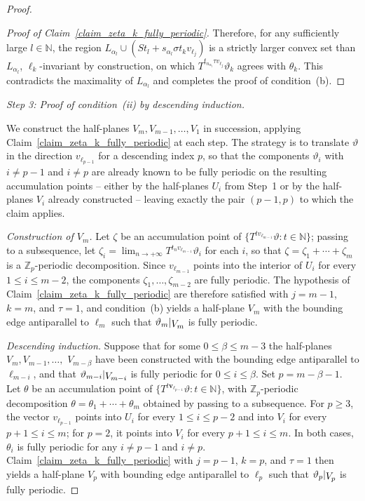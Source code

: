 \documentclass[12pt]{amsart}
\numberwithin{equation}{section}
\newcommand{\bb}[1]{\mathbb{#1}}
\newcommand{\sob}[1]{\ensuremath{{\mathbin |}\raise-.4ex\hbox{$#1$}}}
\begin{document}
\begin{proof}
\begin{proof}[Proof of Claim~\ref{claim_zeta_k_fully_periodic}]
Therefore, for any sufficiently large $l \in \mathbb{N}$, the region
$L_{\alpha_l} \cup (St_l + s_{\alpha_l}\sigma t_k v_{\pmb{\ell}_{j}})$ is a
strictly larger convex set than $L_{\alpha_l}$, $\ell_k$-invariant by
construction, on which $T^{t_{n_{\alpha_l}}\tau v_{\pmb{\ell}_{j}}}\vartheta_k$
agrees with $\theta_k$. This contradicts the maximality of $L_{\alpha_l}$
and completes the proof of condition~(b).
\end{proof}

\medskip

\noindent\textit{Step 3: Proof of condition~\textup{(ii)} by descending induction.}

\smallskip

We construct the half-planes $ V_m, V_{m-1}, \ldots, V_1 $ in succession, applying Claim~\ref{claim_zeta_k_fully_periodic} at each step. The strategy is to translate $ \vartheta $
in the direction $ v_{\pmb{\ell}_{p-1}} $ for a descending index $ p $, so that the components 
$ \vartheta_i $ with $ i \neq p-1 $ and $ i \neq p $ are already known to be fully periodic on 
the resulting accumulation points -- either by the half-planes $ U_i $ from Step~1 or by the half-planes
$ V_i $ already constructed -- leaving exactly the pair $ (p-1,p) $ to which the claim applies.

\textit{Construction of $V_m$.} Let $\zeta$ be an accumulation point of $\{T^{t v_{\pmb{\ell}_{m-1}}}\vartheta : t \in \bb{N}\}$; passing to a subsequence, let $\zeta_i = \lim_{n \to +\infty} T^{t_n v_{\pmb{\ell}_{m-1}}}\vartheta_i$ for each $i$, so that $\zeta = \zeta_1 +\cdots+\zeta_m$ is a $\bb{Z}_p$-periodic decomposition. Since $v_{\pmb{\ell}_{m-1}}$ points into the interior of $U_i$ for every $1 \leq i \leq m-2$, the components $\zeta_1,\ldots,\zeta_{m-2}$ are fully periodic. The hypothesis of Claim~\ref{claim_zeta_k_fully_periodic} are therefore satisfied with $ j = m-1 $, $ k = m $, and $ \tau = 1 $, and condition~(b) yields a half-plane $V_m $ with the bounding edge antiparallel to $\pmb{\ell}_m$ such that $\vartheta_m\sob{V_m}$ is fully periodic.

\textit{Descending induction.} Suppose that for some $0 \leq \beta \leq m-3$ the half-planes $ V_m,V_{m-1}, \ldots, $ $ V_{m-\beta}  $ have been constructed with the bounding edge antiparallel to $\pmb{\ell}_{m-i}$, and that  $\vartheta_{m-i}\sob{V_{m-i}}$ is fully periodic for $0 \leq i \leq \beta$. Set $p = m-\beta-1$. Let $\theta$ be an accumulation point of $\{T^{t\pmb{v}_{\pmb{\ell}_{p-1}}}\vartheta : t \in \bb{N}\}$, with $\bb{Z}_p$-periodic decomposition $\theta = \theta_1+\cdots+\theta_m$ obtained by passing to a subsequence. For $p \geq 3$, the vector $ v_{\pmb{\ell}_{p-1}}$ points into  $U_i$ for every $1 \leq i \leq p-2$ and into $V_i$ for every $p+1 \leq i \leq m$; for $p = 2$, it points into $V_i$ for every $p+1 \leq i \leq m$. In both cases, $\theta_i$ is fully periodic for any $i \neq p-1$ and $i \neq p$. Claim~\ref{claim_zeta_k_fully_periodic} with $ j = p-1 $, $ k = p $, and $ \tau = 1$ then yields a half-plane $V_p $ with bounding edge antiparallel to $\pmb{\ell}_p$ such that $\vartheta_p\sob{V_p}$ is fully periodic.


\end{proof}
\end{document}

